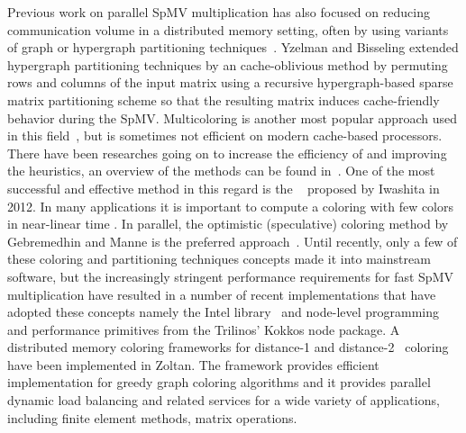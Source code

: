 Previous work on parallel SpMV multiplication has also focused on reducing communication volume in a distributed memory setting, often by using variants of graph or hypergraph partitioning techniques~\cite{Catalyurek:1999}. Yzelman and Bisseling \cite{doi:10.1137/080733243,Yzelman-thesis-2011} extended hypergraph partitioning techniques by an cache-oblivious method by permuting rows and columns of the input matrix using a recursive hypergraph-based sparse matrix partitioning scheme so that the resulting matrix induces cache-friendly behavior during the SpMV. Multicoloring is another most popular approach used in this field~\cite{MC}, but is sometimes not efficient on modern cache-based processors. There have been researches going on to increase the efficiency of \MCfull and improving the heuristics, an overview of the methods can be found in~\cite{equitable_color,dist_k_def,COLPACK}. One of the most successful and effective method in this regard is the \ABMCfull~\cite{ABMC} proposed by Iwashita \etal in 2012. In many applications it is important to compute a coloring with few colors in near-linear time \cite{doi:10.1137/13093426X}. In parallel, the optimistic (speculative) coloring method by Gebremedhin and Manne \cite{gebremedhin2000scalable} is the preferred approach~\cite{Boman:2016}. 
Until recently, only a few of these coloring and partitioning techniques concepts made it into mainstream software, but the increasingly stringent performance requirements for fast SpMV multiplication have resulted in a number of recent implementations that have adopted these concepts namely the Intel \MKL library~\cite{MKL} and node-level programming and performance primitives from the Trilinos’ Kokkos node package\cite{kokkos}. A distributed memory coloring frameworks for distance-1\cite{BOZDAG2008515} and distance-2~\cite{doi:10.1137/080732158} coloring have been implemented in Zoltan. The framework provides efficient implementation for greedy graph coloring algorithms and it provides parallel dynamic load balancing and related services for a wide variety of applications, including finite element methods, matrix operations.


